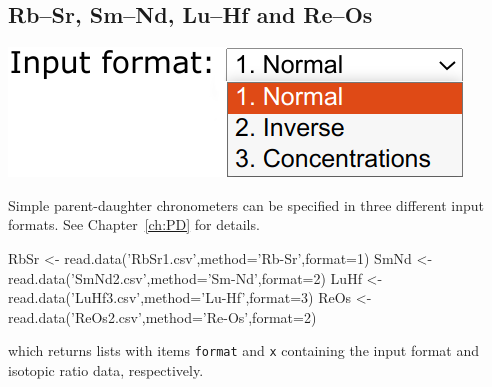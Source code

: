 \begin{refsection}

\chapter{Rb--Sr, Sm--Nd, Lu--Hf and Re--Os}\label{ch:PD-R}

\noindent\begin{minipage}[t]{.3\linewidth}
\strut\vspace*{-\baselineskip}\newline
\includegraphics[width=\linewidth]{../figures/PDformats.png}
\end{minipage}
\begin{minipage}[t]{.7\textwidth}
  Simple parent-daughter chronometers can be specified in three
  different input formats. See Chapter~\ref{ch:PD} for details.
\end{minipage}

\begin{script}
RbSr <- read.data('RbSr1.csv',method='Rb-Sr',format=1)
SmNd <- read.data('SmNd2.csv',method='Sm-Nd',format=2)
LuHf <- read.data('LuHf3.csv',method='Lu-Hf',format=3)
ReOs <- read.data('ReOs2.csv',method='Re-Os',format=2)
\end{script}

\noindent which returns lists with items \texttt{format} and
\texttt{x} containing the input format and isotopic ratio data,
respectively.\\


\end{refsection}
